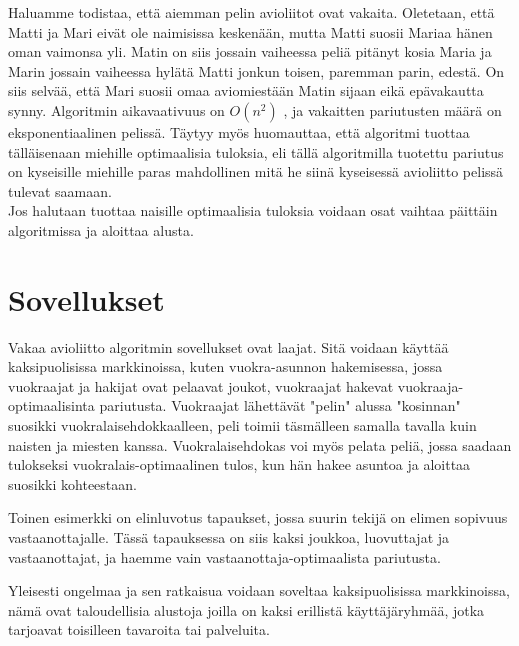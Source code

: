 \documentclass[finnish]{tktltiki2}
\theoremstyle{definition}
\theoremstyle{remark}
\begin{document}
Haluamme todistaa, että aiemman pelin avioliitot ovat vakaita.
Oletetaan, että Matti ja Mari eivät ole naimisissa keskenään, mutta Matti suosii Mariaa hänen oman vaimonsa yli. Matin on siis jossain vaiheessa peliä pitänyt kosia Maria ja Marin jossain vaiheessa hylätä Matti jonkun toisen, paremman parin, edestä. On siis selvää, että Mari suosii omaa aviomiestään Matin sijaan eikä epävakautta synny. \cite[p. 13]{gale62a} Algoritmin aikavaativuus on $O(n^2)$ \cite[p. 588]{Balinski}, ja vakaitten pariutusten määrä on eksponentiaalinen pelissä. \cite[p. 591]{Balinski} Täytyy myös huomauttaa, että algoritmi tuottaa tälläisenaan miehille optimaalisia tuloksia, eli tällä algoritmilla tuotettu pariutus on kyseisille miehille paras mahdollinen mitä he siinä kyseisessä avioliitto pelissä tulevat saamaan.\\
Jos halutaan tuottaa naisille optimaalisia tuloksia voidaan osat vaihtaa päittäin algoritmissa ja aloittaa alusta.


\section{Sovellukset}
Vakaa avioliitto algoritmin sovellukset ovat laajat. Sitä voidaan käyttää kaksipuolisissa markkinoissa, kuten vuokra-asunnon hakemisessa, jossa vuokraajat ja hakijat ovat pelaavat joukot, vuokraajat hakevat vuokraaja-optimaalisinta pariutusta. Vuokraajat lähettävät "pelin" alussa "kosinnan" suosikki vuokralaisehdokkaalleen, peli toimii täsmälleen samalla tavalla kuin naisten ja miesten kanssa.
Vuokralaisehdokas voi myös pelata peliä, jossa saadaan tulokseksi vuokralais-optimaalinen tulos, kun hän hakee asuntoa ja aloittaa suosikki kohteestaan.

Toinen esimerkki on elinluvotus tapaukset, jossa suurin tekijä on elimen sopivuus vastaanottajalle. Tässä tapauksessa on siis kaksi joukkoa, luovuttajat ja vastaanottajat, ja haemme vain vastaanottaja-optimaalista pariutusta.

Yleisesti ongelmaa ja sen ratkaisua voidaan soveltaa kaksipuolisissa markkinoissa, nämä ovat taloudellisia alustoja joilla on kaksi erillistä käyttäjäryhmää, jotka tarjoavat toisilleen tavaroita tai palveluita.


%
%
% 
%




\lastpage
\end{document}
